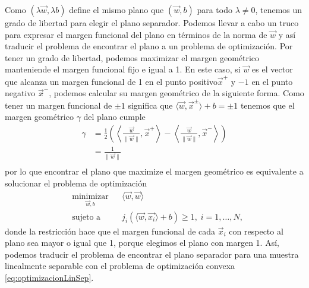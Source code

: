 \documentclass[letterpaper,12pt]{book}
\begin{document}
Como $(\lambda\vec{w}, \lambda b)$ define el mismo plano que $(\vec{w}, b)$  para todo $\lambda \neq 0$, tenemos un grado de libertad para elegir el plano separador. Podemos llevar a cabo un truco para expresar el margen funcional del plano en términos de la norma de $\vec{w}$ y así traducir el problema de encontrar el plano a un problema de optimización. Por tener un grado de libertad,  podemos maximizar el margen geométrico manteniende el margen funcional fijo e igual a 1. En este caso, si $\vec{w}$ es el vector que alcanza un margen funcional de 1 en el punto  positivo$\vec{x}^+$ y $-1$ en el punto negativo $\vec{x}^-$, podemos calcular su margen geométrico de la siguiente forma. Como tener un margen funcional de $\pm 1$ significa que $\langle \vec{w}, \vec{x}^{\pm}\rangle +b = \pm 1$ tenemos que el margen geométrico $\gamma$ del plano cumple
\begin{equation}
  \begin{aligned}
    \gamma &=\frac{1}{2}\left(\left\langle\frac{\vec{w}}{\|\vec{w}\|},\vec{x}^+\right\rangle-\left\langle\frac{\vec{w}}{\|\vec{w}\|},\vec{x}^-\right\rangle\right) \\
    & = \frac{1}{\|\vec{w}\|}\\ 
  \end{aligned}
\end{equation}
por lo que encontrar el plano que maximize el margen geométrico es equivalente a solucionar el problema de optimización
\begin{equation}\label{eq:optimizacionLinSep}
\begin{aligned}
& \underset{\vec{w},b}{\text{minimizar}}
& & \langle \vec{w}, \vec{w} \rangle \\
& \text{sujeto a}
& & j_i(\langle \vec{w}, \vec{x_i}\rangle + b)\geq 1, \; i = 1, \ldots, N,
\end{aligned}
\end{equation}
donde la restricción hace que el margen funcional de cada $\vec{x}_i$ con respecto al plano sea mayor o igual que 1, porque elegimos el plano con margen 1. Así, podemos traducir el problema de encontrar el plano separador para una muestra linealmente separable con el problema de optimización convexa \ref{eq:optimizacionLinSep}.
\end{document}
